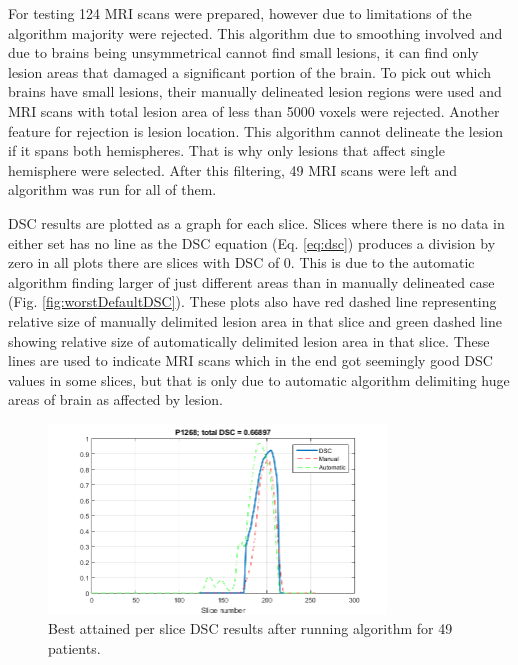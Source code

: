 \documentclass[12pt]{article}
\begin{document}
For testing 124 MRI scans were prepared, however due to limitations of the algorithm majority were rejected. This algorithm due to smoothing involved and due to brains being unsymmetrical cannot find small lesions, it can find only lesion areas that damaged a significant portion of the brain. To pick out which brains have small lesions, their manually delineated lesion regions were used and MRI scans with total lesion area of less than 5000 voxels were rejected. Another feature for rejection is lesion location. This algorithm cannot delineate the lesion if it spans both hemispheres. That is why only lesions that affect single hemisphere were selected. After this filtering, 49 MRI scans were left and algorithm was run for all of them.

DSC results are plotted as a graph for each slice. Slices where there is no data in either set has no line as the DSC equation (Eq. \ref{eq:dsc}) produces a division by zero in all plots there are slices with DSC of 0. This is due to the automatic algorithm finding larger of just different areas than in manually delineated case (Fig. \ref{fig:worstDefaultDSC}). These plots also have red dashed line representing relative size of manually delimited lesion area in that slice and green dashed line showing relative size of automatically delimited lesion area in that slice. These lines are used to indicate MRI scans which in the end got seemingly good DSC values in some slices, but that is only due to automatic algorithm delimiting huge areas of brain as affected by lesion.

\begin{figure}[!htb]
\centering
\includegraphics[width=0.8\textwidth]{img/P1268_L}
\caption{Best attained per slice DSC results after running algorithm for 49 patients.}
\label{fig:bestDefaultDSC}
\end{figure}
\end{document}

